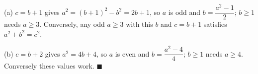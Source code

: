 (a) $c=b+1$ gives $a^2=(b+1)^2-b^2=2b+1$, so $a$ is odd and $b=\dfrac{a^2-1}2$; $b\ge1$ needs $a\ge3$. Conversely, any odd $a\ge3$ with this $b$ and $c=b+1$ satisfies $a^2+b^2=c^2$.

(b) $c=b+2$ gives $a^2=4b+4$, so $a$ is even and $b=\dfrac{a^2-4}4$; $b\ge1$ needs $a\ge4$. Conversely these values work. $\blacksquare$
